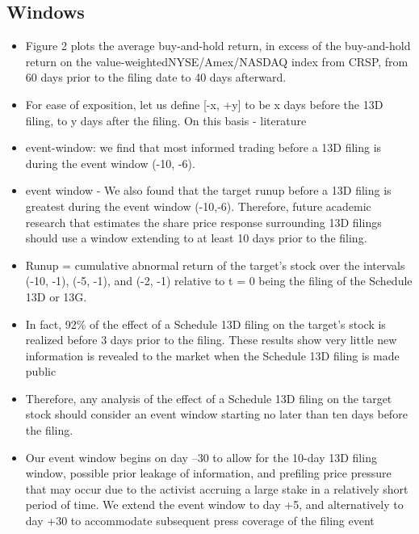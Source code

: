 \documentclass[12pt]{article}
\begin{document}
\subsection{Windows}

    \begin{itemize}

        \item Figure 2 plots the average buy-and-hold return, in excess of the buy-and-hold return on the value-weightedNYSE/Amex/NASDAQ index from CRSP, from 60 days prior to the filing date to 40 days afterward.\citep{Collin-Dufresne2015}

        \item For ease of exposition, let us define [-x, +y] to be x days before the 13D filing, to y days after the filing. On this basis - literature \citep{CoffeeJr.2014}

        \item event-window: we find that most informed trading before a 13D filing is during the event window (-10, -6).\citep{Brigida2012}


        \item event window - We also found that the target runup before a 13D filing is greatest during the event window (-10,-6). Therefore, future academic research that estimates the share price response surrounding 13D filings should use a window extending to at least 10 days prior to the filing. \citep{Brigida2012}

        \item Runup = cumulative abnormal return of the target’s stock over the intervals (-10, -1), (-5, -1), and (-2, -1) relative to t = 0 being the filing of the Schedule 13D or 13G. \citep{Brigida2012}
        
        \item In fact, 92\% of the effect of a Schedule 13D filing on the target’s stock is realized before 3 days prior to the filing. These results show very little new information is revealed to the market when the Schedule 13D filing is made public \citep{Brigida2012}

        \item Therefore, any analysis of the effect of a Schedule 13D filing on the target stock should consider an event window starting no later than ten days before the filing. \citep{Brigida2012}

        \item Our event window begins on day –30 to allow for the 10-day 13D filing window, possible prior leakage of information, and prefiling price pressure that may occur due to the activist accruing a large stake in a relatively short period of time. We extend the event window to day +5, and alternatively to day +30 to accommodate subsequent press coverage of the filing event \citep{Klein2009}
    \end{itemize}
\end{document}
